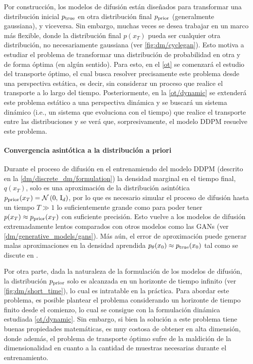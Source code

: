 Por construcción, los modelos de difusión están diseñados para transformar una distribución inicial $p_{\operatorname{true}}$ en otra distribución final $p_{\operatorname{prior}}$ (generalmente gaussiana), y viceversa. Sin embargo, muchas veces se desea trabajar en un marco más flexible, donde la distribución final $p(x_T)$ pueda ser cualquier otra distribución, no necesariamente gaussiana (ver \autoref{fig:dm/cyclegan}). Esto motiva a estudiar el problema de transformar una distribución de probabilidad en otra y de forma óptima (en algún sentido). Para esto, en el \autoref{ot} se comenzará el estudio del transporte óptimo, el cual busca resolver precisamente este problema desde una perspectiva estática, es decir, sin considerar un proceso que realice el transporte a lo largo del tiempo. Posteriormente, en la \autoref{ot/dynamic} se extenderá este problema estático a una perspectiva dinámica y se buscará un sistema dinámico (i.e., un sistema que evoluciona con el tiempo) que realice el transporte entre las distribuciones y se verá que, sorpresivamente, el modelo DDPM resuelve este problema.


\paragraph{Convergencia asintótica a la distribución a priori}

Durante el proceso de difusión en el entrenamiendo del modelo DDPM (descrito en la \autoref{dm/discrete_dm/formulation}) la densidad marginal en el tiempo final, $q(x_T)$, solo es una aproximación de la distribución asintótica $p_{\operatorname{prior}}(x_T)=\mathcal{N}\left(0,\,\operatorname{I}_{d}\right)$, por lo que es necesario simular el proceso de difusión hasta un tiempo $T\gg1$ lo suficientemente grande como para poder tener $p(x_T)\approx p_{\operatorname{prior}}(x_T)$ con suficiente precisión. Esto vuelve a los modelos de difusión extremadamente lentos comparados con otros modelos como las GANs (ver \autoref{dm/generative_models/gans}). Más aún, el error de aproximación puede generar malas aproximaciones en la densidad aprendida $p_\theta(x_0)\approx p_{\operatorname{true}}(x_0)$ tal como se discute en \cite{debortoli2023diffusion}.

Por otra parte, dada la naturaleza de la formulación de los modelos de difusión, la distribución $p_{\operatorname{prior}}$ solo es alcanzada en un horizonte de tiempo infinito (ver \autoref{fig:dm/short_time}), lo cual es intratable en la práctica. Para abordar este problema, es posible plantear el problema considerando un horizonte de tiempo finito desde el comienzo, lo cual se consigue con la formulación dinámica estudiada \autoref{ot/dynamic}. Sin embargo, si bien la solución a este problema tiene buenas propiedades matemáticas, es muy costosa de obtener en alta dimensión, donde además, el problema de transporte óptimo sufre de la maldición de la dimensionalidad en cuanto a la cantidad de muestras necesarias durante el entrenamiento.

